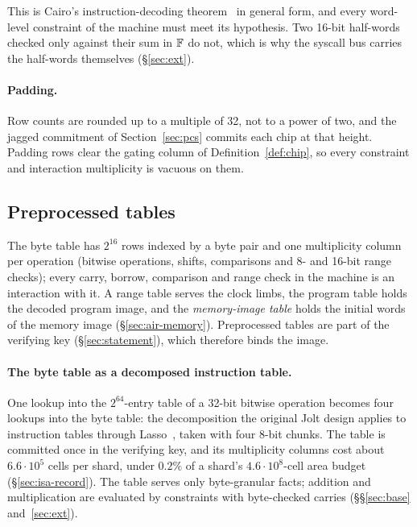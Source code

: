 This is Cairo's instruction-decoding theorem~\citep[Thm.~1]{cairo} in general form, and every word-level constraint of the machine must meet its hypothesis. Two 16-bit half-words checked only against their sum in $\mathbb{F}$ do not, which is why the syscall bus carries the half-words themselves (\S\ref{sec:ext}).

\paragraph{Padding.} Row counts are rounded up to a multiple of 32, not to a power of two, and the jagged commitment of Section~\ref{sec:pcs} commits each chip at that height. Padding rows clear the gating column of Definition~\ref{def:chip}, so every constraint and interaction multiplicity is vacuous on them.

\subsection{Preprocessed tables}
\label{sec:air-tables}

The byte table has $2^{16}$ rows indexed by a byte pair and one multiplicity column per operation (bitwise operations, shifts, comparisons and 8- and 16-bit range checks); every carry, borrow, comparison and range check in the machine is an interaction with it. A range table serves the clock limbs, the program table holds the decoded program image, and the \emph{memory-image table} holds the initial words of the memory image (\S\ref{sec:air-memory}). Preprocessed tables are part of the verifying key (\S\ref{sec:statement}), which therefore binds the image.

\paragraph{The byte table as a decomposed instruction table.}\label{sec:air-bytes} One lookup into the $2^{64}$-entry table of a 32-bit bitwise operation becomes four lookups into the byte table: the decomposition the original Jolt design applies to instruction tables through Lasso~\citep{jolt,lasso}, taken with four 8-bit chunks. The table is committed once in the verifying key, and its multiplicity columns cost about $6.6\cdot10^{5}$ cells per shard, under $0.2\%$ of a shard's $4.6\cdot10^{8}$-cell area budget (\S\ref{sec:isa-record}). The table serves only byte-granular facts; addition and multiplication are evaluated by constraints with byte-checked carries (\S\S\ref{sec:base} and~\ref{sec:ext}).

